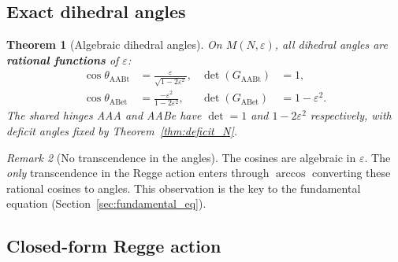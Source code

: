\documentclass[12pt]{article}
\newtheorem{theorem}{Theorem}[section]
\theoremstyle{remark}
\newtheorem{remark}[theorem]{Remark}
\theoremstyle{definition}
\begin{document}
\subsection{Exact dihedral angles}
\label{sec:exact_dihedrals}

\begin{theorem}[Algebraic dihedral angles]
\label{thm:exact_dihedrals}
On $M(N,\varepsilon)$, all dihedral angles are \textbf{rational functions} of $\varepsilon$:
\begin{align}
\cos\theta_{\mathrm{AABt}} &= \frac{\varepsilon}{\sqrt{1 - 2\varepsilon^2}}, &
\det(G_{\mathrm{AABt}}) &= 1, \\[4pt]
\cos\theta_{\mathrm{ABet}} &= \frac{-\varepsilon^2}{1 - 2\varepsilon^2}, &
\det(G_{\mathrm{ABet}}) &= 1 - \varepsilon^2.
\end{align}
The shared hinges AAA and AABe have $\det = 1$ and $1\!-\!2\varepsilon^2$ respectively, with deficit angles fixed by Theorem~\ref{thm:deficit_N}.
\end{theorem}

\begin{remark}[No transcendence in the angles]
The cosines are algebraic in $\varepsilon$.  The \emph{only} transcendence in the Regge action enters through $\arccos$ converting these rational cosines to angles.  This observation is the key to the fundamental equation (Section~\ref{sec:fundamental_eq}).
\end{remark}

\subsection{Closed-form Regge action}
\label{sec:closed_action}
\end{document}
